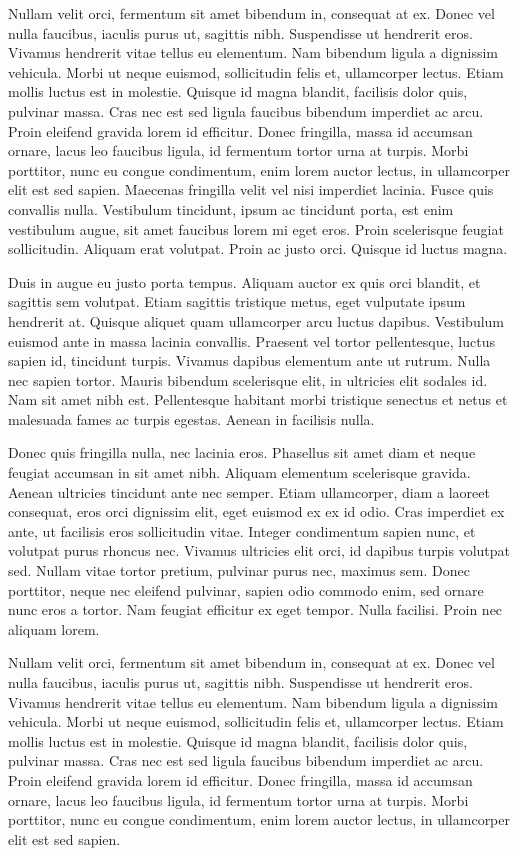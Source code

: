 \documentclass[conference]{gds-review}
\begin{document}
Nullam velit orci, fermentum sit amet bibendum in, consequat at ex. Donec vel nulla faucibus, iaculis purus ut, sagittis nibh. Suspendisse ut hendrerit eros. Vivamus hendrerit vitae tellus eu elementum. Nam bibendum ligula a dignissim vehicula. Morbi ut neque euismod, sollicitudin felis et, ullamcorper lectus. Etiam mollis luctus est in molestie. Quisque id magna blandit, facilisis dolor quis, pulvinar massa. Cras nec est sed ligula faucibus bibendum imperdiet ac arcu. Proin eleifend gravida lorem id efficitur. Donec fringilla, massa id accumsan ornare, lacus leo faucibus ligula, id fermentum tortor urna at turpis. Morbi porttitor, nunc eu congue condimentum, enim lorem auctor lectus, in ullamcorper elit est sed sapien. 
Maecenas fringilla velit vel nisi imperdiet lacinia. Fusce quis convallis nulla. Vestibulum tincidunt, ipsum ac tincidunt porta, est enim vestibulum augue, sit amet faucibus lorem mi eget eros. Proin scelerisque feugiat sollicitudin. Aliquam erat volutpat. Proin ac justo orci. Quisque id luctus magna.

Duis in augue eu justo porta tempus. Aliquam auctor ex quis orci blandit, et sagittis sem volutpat. Etiam sagittis tristique metus, eget vulputate ipsum hendrerit at. Quisque aliquet quam ullamcorper arcu luctus dapibus. Vestibulum euismod ante in massa lacinia convallis. Praesent vel tortor pellentesque, luctus sapien id, tincidunt turpis. Vivamus dapibus elementum ante ut rutrum. Nulla nec sapien tortor. Mauris bibendum scelerisque elit, in ultricies elit sodales id. Nam sit amet nibh est. Pellentesque habitant morbi tristique senectus et netus et malesuada fames ac turpis egestas. Aenean in facilisis nulla.

Donec quis fringilla nulla, nec lacinia eros. Phasellus sit amet diam et neque feugiat accumsan in sit amet nibh. Aliquam elementum scelerisque gravida. Aenean ultricies tincidunt ante nec semper. Etiam ullamcorper, diam a laoreet consequat, eros orci dignissim elit, eget euismod ex ex id odio. Cras imperdiet ex ante, ut facilisis eros sollicitudin vitae. Integer condimentum sapien nunc, et volutpat purus rhoncus nec. Vivamus ultricies elit orci, id dapibus turpis volutpat sed. Nullam vitae tortor pretium, pulvinar purus nec, maximus sem. Donec porttitor, neque nec eleifend pulvinar, sapien odio commodo enim, sed ornare nunc eros a tortor. Nam feugiat efficitur ex eget tempor. Nulla facilisi. Proin nec aliquam lorem.

Nullam velit orci, fermentum sit amet bibendum in, consequat at ex. Donec vel nulla faucibus, iaculis purus ut, sagittis nibh. Suspendisse ut hendrerit eros. Vivamus hendrerit vitae tellus eu elementum. Nam bibendum ligula a dignissim vehicula. Morbi ut neque euismod, sollicitudin felis et, ullamcorper lectus. Etiam mollis luctus est in molestie. Quisque id magna blandit, facilisis dolor quis, pulvinar massa. Cras nec est sed ligula faucibus bibendum imperdiet ac arcu. Proin eleifend gravida lorem id efficitur. Donec fringilla, massa id accumsan ornare, lacus leo faucibus ligula, id fermentum tortor urna at turpis. Morbi porttitor, nunc eu congue condimentum, enim lorem auctor lectus, in ullamcorper elit est sed sapien. 


 
\end{document}
